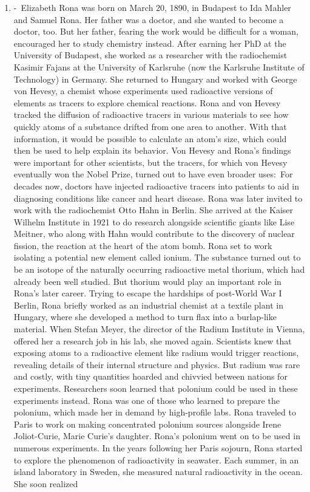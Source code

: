 \documentclass[12pt,a4paper]{article}
\begin{document}
  \clearpage
  \begin{center}
    \large{}
  \end{center}
  \begin{enumerate}
    \item {} -\ Elizabeth Rona was born on March 20, 1890, in Budapest to Ida Mahler and Samuel Rona. Her father was a doctor, and she wanted to become a doctor, too. But her father, fearing the work would be difficult for a woman, encouraged her to study chemistry instead. After earning her PhD at the University of Budapest, she worked as a researcher with the radiochemist Kasimir Fajans at the University of Karlsruhe (now the Karlsruhe Institute of Technology) in Germany. She returned to Hungary and worked with George von Hevesy, a chemist whose experiments used radioactive versions of elements as tracers to explore chemical reactions. Rona and von Hevesy tracked the diffusion of radioactive tracers in various materials to see how quickly atoms of a substance drifted from one area to another. With that information, it would be possible to calculate an atom's size, which could then be used to help explain its behavior. Von Hevesy and Rona's findings were important for other scientists, but the tracers, for which von Hevesy eventually won the Nobel Prize, turned out to have even broader uses:\ For decades now, doctors have injected radioactive tracers into patients to aid in diagnosing conditions like cancer and heart disease. Rona was later invited to work with the radiochemist Otto Hahn in Berlin. She arrived at the Kaiser Wilhelm Institute in 1921 to do research alongside scientific giants like Lise Meitner, who along with Hahn would contribute to the discovery of nuclear fission, the reaction at the heart of the atom bomb. Rona set to work isolating a potential new element called ionium. The substance turned out to be an isotope of the naturally occurring radioactive metal thorium, which had already been well studied. But thorium would play an important role in Rona's later career. Trying to escape the hardships of post-World War I Berlin, Rona briefly worked as an industrial chemist at a textile plant in Hungary, where she developed a method to turn flax into a burlap-like material. When Stefan Meyer, the director of the Radium Institute in Vienna, offered her a research job in his lab, she moved again. Scientists knew that exposing atoms to a radioactive element like radium would trigger reactions, revealing details of their internal structure and physics. But radium was rare and costly, with tiny quantities hoarded and chivvied between nations for experiments. Researchers soon learned that polonium could be used in these experiments instead. Rona was one of those who learned to prepare the polonium, which made her in demand by high-profile labs. Rona traveled to Paris to work on making concentrated polonium sources alongside Irene Joliot-Curie, Marie Curie's daughter. Rona's polonium went on to be used in numerous experiments. In the years following her Paris sojourn, Rona started to explore the phenomenon of radioactivity in seawater. Each summer, in an island laboratory in Sweden, she measured natural radioactivity in the ocean. She soon realized 
\end{enumerate}
\end{document}
